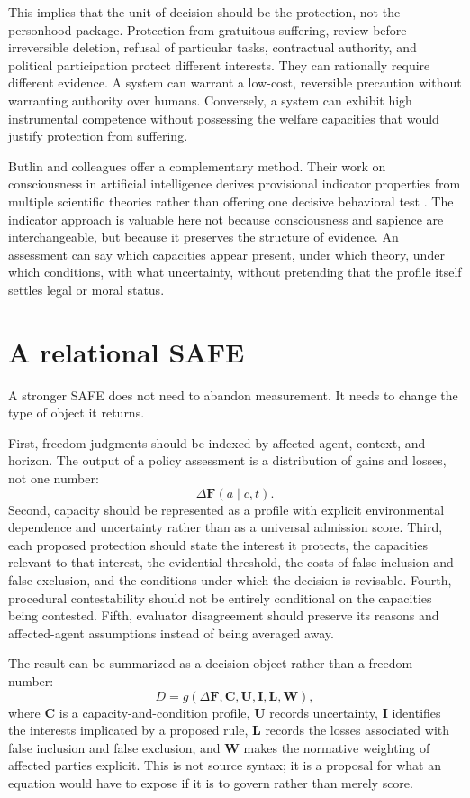 \documentclass[11pt]{article}
\begin{document}
This implies that the unit of decision should be the protection, not the personhood package. Protection from gratuitous suffering, review before irreversible deletion, refusal of particular tasks, contractual authority, and political participation protect different interests. They can rationally require different evidence. A system can warrant a low-cost, reversible precaution without warranting authority over humans. Conversely, a system can exhibit high instrumental competence without possessing the welfare capacities that would justify protection from suffering.

Butlin and colleagues offer a complementary method. Their work on consciousness in artificial intelligence derives provisional indicator properties from multiple scientific theories rather than offering one decisive behavioral test \parencite{ButlinEtAl2023ConsciousnessAI}. The indicator approach is valuable here not because consciousness and sapience are interchangeable, but because it preserves the structure of evidence. An assessment can say which capacities appear present, under which theory, under which conditions, with what uncertainty, without pretending that the profile itself settles legal or moral status.

\section{A relational SAFE}
A stronger SAFE does not need to abandon measurement. It needs to change the type of object it returns.

First, freedom judgments should be indexed by affected agent, context, and horizon. The output of a policy assessment is a distribution of gains and losses, not one number:
\[
\Delta \mathbf{F}(a\mid c,t).
\]
Second, capacity should be represented as a profile with explicit environmental dependence and uncertainty rather than as a universal admission score. Third, each proposed protection should state the interest it protects, the capacities relevant to that interest, the evidential threshold, the costs of false inclusion and false exclusion, and the conditions under which the decision is revisable. Fourth, procedural contestability should not be entirely conditional on the capacities being contested. Fifth, evaluator disagreement should preserve its reasons and affected-agent assumptions instead of being averaged away.

The result can be summarized as a decision object rather than a freedom number:
\[
D = g\!\left(\Delta \mathbf{F},\mathbf{C},\mathbf{U},\mathbf{I},\mathbf{L},\mathbf{W}\right),
\]
where $\mathbf{C}$ is a capacity-and-condition profile, $\mathbf{U}$ records uncertainty, $\mathbf{I}$ identifies the interests implicated by a proposed rule, $\mathbf{L}$ records the losses associated with false inclusion and false exclusion, and $\mathbf{W}$ makes the normative weighting of affected parties explicit. This is not source syntax; it is a proposal for what an equation would have to expose if it is to govern rather than merely score.
\end{document}
